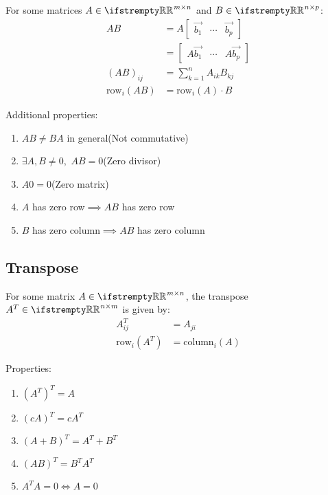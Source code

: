 \documentclass[12pt, a4paper]{article}
\begin{document}
\begin{multicols*}{3}
For some matrices $A \in \RR^{m{\times}n}$ and $B \in \RR^{n{\times}p}$:
\begin{align*}
  AB &= A\begin{bmatrix}\vec{b_1} & \cdots & \vec{b_p}\end{bmatrix} \\
                                 &= \begin{bmatrix}A\vec{b_1} & \cdots & A\vec{b_p}\end{bmatrix} \\ 
  (AB)_{ij} &= \sum^n_{k=1}A_{ik}B_{kj} \\
  \text{row}_i(AB) &= \text{row}_i(A){\cdot}B
\end{align*}

Additional properties:
\begin{enumerate}[\roman*.]
  \item $AB \neq BA$ in general\hfill(Not commutative)
  \item $\exists A,B\neq 0,$ $AB = 0$\hfill(Zero divisor)
  \item $A0 = 0$\hfill(Zero matrix)
  \item $A$ has zero row$\implies AB$ has zero row
  \item $B$ has zero column$\implies AB$ has zero column
\end{enumerate}

\subsection{Transpose}
For some matrix $A \in \RR^{m{\times}n}$, the transpose $A^T \in \RR^{n{\times}m}$ is given by:
\begin{align*}
  A^T_{ij} &= A_{ji} \\
  \text{row}_i(A^T) &= \text{column}_i(A)
\end{align*}

Properties:
\begin{enumerate}[\roman*.]
  \item $(A^T)^T = A$
  \item $(cA)^T = cA^T$
  \item $(A + B)^T = A^T + B^T$
  \item $(AB)^T = B^TA^T$
  \item $A^TA = 0 \iff A = 0$
\end{enumerate}

\colbreak

\end{multicols*}
\end{document}
